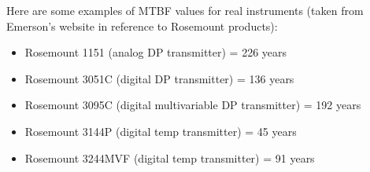 \vskip 10pt

Here are some examples of MTBF values for real instruments (taken from Emerson's website in reference to Rosemount products):

\begin{itemize}
\item{} Rosemount 1151 (analog DP transmitter) = 226 years
\item{} Rosemount 3051C (digital DP transmitter) = 136 years
\item{} Rosemount 3095C (digital multivariable DP transmitter) = 192 years
\item{} Rosemount 3144P (digital temp transmitter) = 45 years
\item{} Rosemount 3244MVF (digital temp transmitter) = 91 years
\end{itemize}





